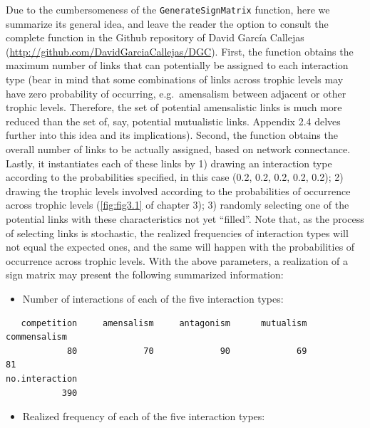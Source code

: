 Due to the cumbersomeness of the \texttt{GenerateSignMatrix} function, here we summarize its general idea, and leave the reader the option to consult the complete function in the Github repository of David García Callejas (\url{http://github.com/DavidGarciaCallejas/DGC}). First, the function obtains the maximum number of links that can potentially be assigned to each interaction type (bear in mind that some combinations of links across trophic levels may have zero probability of occurring, e.g.~amensalism between adjacent or other trophic levels. Therefore, the set of potential amensalistic links is much more reduced than the set of, say, potential mutualistic links. Appendix 2.4 delves further into this idea and its implications). Second, the function obtains the overall number of links to be actually assigned, based on network connectance. Lastly, it instantiates each of these links by 1) drawing an interaction type according to the probabilities specified, in this case (0.2, 0.2, 0.2, 0.2, 0.2); 2) drawing the trophic levels involved according to the probabilities of occurrence across trophic levels (\cref{fig:fig3.1} of chapter 3); 3) randomly selecting one of the potential links with these characteristics not yet ``filled''. Note that, as the process of selecting links is stochastic, the realized frequencies of interaction types will not equal the expected ones, and the same will happen with the probabilities of occurrence across trophic levels. With the above parameters, a realization of a sign matrix may present the following summarized information:

\begin{itemize}
\tightlist
\item
  Number of interactions of each of the five interaction types:\\
   \small
\end{itemize}

\begin{verbatim}
   competition     amensalism     antagonism      mutualism   commensalism
            80             70             90             69             81
no.interaction
           390
\end{verbatim}

\normalsize

\begin{itemize}
\tightlist
\item
  Realized frequency of each of the five interaction types:\\
   \small
\end{itemize}

